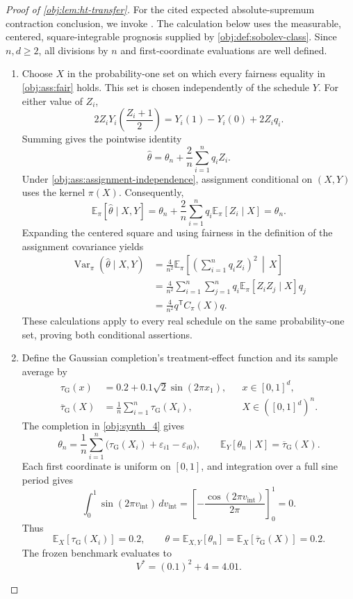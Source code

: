 \begin{proof}[Proof of \cref{obj:lem:ht-transfer}]
For the cited expected absolute-supremum contraction conclusion, we invoke \citep[Theorem 12(4), with the convention of Definition 2]{BartlettMendelson2002Complexities}.
The calculation below uses the measurable, centered, square-integrable prognosis supplied by \cref{obj:def:sobolev-class}. Since \(n,d\geq2\), all divisions by \(n\) and first-coordinate evaluations are well defined.

\begin{enumerate}
\item
Choose \(X\) in the probability-one set on which every fairness equality in \cref{obj:ass:fair} holds. This set is chosen independently of the schedule \(Y\). For either value of \(Z_i\),
\[
2Z_iY_i\!\left(\frac{Z_i+1}{2}\right)
=
Y_i(1)-Y_i(0)+2Z_iq_i.
\]
Summing gives the pointwise identity
\[
\widehat\theta
=
\theta_n+\frac2n\sum_{i=1}^n q_iZ_i.
\]
Under \cref{obj:ass:assignment-independence}, assignment conditional on \((X,Y)\) uses the kernel \(\pi(X)\). Consequently,
\[
\mathbb E_\pi[\widehat\theta\mid X,Y]
=
\theta_n+\frac2n\sum_{i=1}^n
q_i\mathbb E_\pi[Z_i\mid X]
=
\theta_n.
\]
Expanding the centered square and using fairness in the definition of the assignment covariance yields
\[
\begin{aligned}
\operatorname{Var}_\pi(\widehat\theta\mid X,Y)
&=
\frac4{n^2}
\mathbb E_\pi\!\left[
\left(\sum_{i=1}^n q_iZ_i\right)^2
\,\middle|\,X\right]\\
&=
\frac4{n^2}\sum_{i=1}^n\sum_{j=1}^n
q_i\mathbb E_\pi[Z_iZ_j\mid X]q_j\\
&=
\frac4{n^2}q^{\mathsf T}C_\pi(X)q.
\end{aligned}
\]
These calculations apply to every real schedule on the same probability-one set, proving both conditional assertions. %

\item
Define the Gaussian completion's treatment-effect function and its sample average by
\[
\begin{aligned}
\tau_{\mathrm G}(x)
&=
0.2+0.1\sqrt2\sin(2\pi x_1),
&&x\in[0,1]^d,\\
\overline\tau_{\mathrm G}(X)
&=
\frac1n\sum_{i=1}^n\tau_{\mathrm G}(X_i),
&&X\in([0,1]^d)^n.
\end{aligned}
\]
The completion in \cref{obj:synth_4} gives
\[
\theta_n
=
\frac1n\sum_{i=1}^n
\bigl(\tau_{\mathrm G}(X_i)+\varepsilon_{i1}-\varepsilon_{i0}\bigr),
\qquad
\mathbb E_Y[\theta_n\mid X]
=
\overline\tau_{\mathrm G}(X).
\]
Each first coordinate is uniform on \([0,1]\), and integration over a full sine period gives
\[
\int_0^1\sin(2\pi v_{\mathrm{int}})\,dv_{\mathrm{int}}
=
\left[-\frac{\cos(2\pi v_{\mathrm{int}})}{2\pi}\right]_0^1
=
0.
\]
Thus
\[
\mathbb E_X[\tau_{\mathrm G}(X_i)]=0.2,
\qquad
\theta
=
\mathbb E_{X,Y}[\theta_n]
=
\mathbb E_X[\overline\tau_{\mathrm G}(X)]
=
0.2.
\]
The frozen benchmark evaluates to
\[
V^*=(0.1)^2+4=4.01.
\]


\end{enumerate}
\end{proof}
